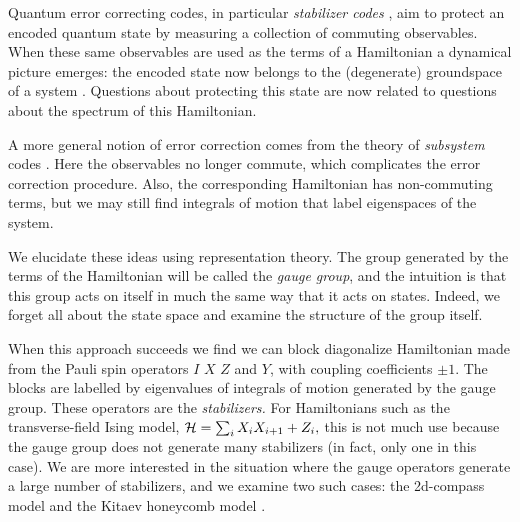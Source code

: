 \documentclass[12pt,notitlepage,longbibliography,nofootinbib,tightenlines]{revtex4}
\begin{document}
Quantum error correcting codes,
in particular {\it stabilizer codes} \cite{Gottesman1997},
aim to protect an encoded quantum state
by measuring a collection of commuting
observables.
When these same observables are used as
the terms of a Hamiltonian 
a dynamical picture emerges: the
encoded state now belongs to the
(degenerate) groundspace of a
system \cite{Dennis2001}. 
Questions about protecting
this state are now related to questions about
the spectrum of this Hamiltonian.

A more general notion of error correction
comes from the theory of 
{\it subsystem} codes \cite{Poulin2005}. 
Here the observables
no longer commute, which complicates
the error correction procedure.
Also, the corresponding Hamiltonian
has non-commuting terms, but
we may still find integrals of
motion that label eigenspaces
of the system.

We elucidate these ideas using representation theory. 
The group generated by the terms of the Hamiltonian
will be called the {\it gauge group},
and the intuition is that this
group acts on itself in much the same way
that it acts on states. 
Indeed, we forget all about the state space and
examine the structure of the group itself.

When this approach succeeds we find we can
block diagonalize Hamiltonian made from 
the Pauli spin operators
$I$ $X$ $Z$ and $Y$, with coupling coefficients
$\pm 1.$
The blocks are labelled by eigenvalues of
integrals of motion generated by the gauge
group. These operators are the {\it stabilizers.}
For Hamiltonians such as
the transverse-field Ising model,
$\mathcal{H} = \sum_i X_i X_{i+1} + Z_i,$
this is not much use because the 
gauge group does not generate many
stabilizers (in fact, only one in this case).
We are more interested in the situation
where the gauge operators generate a large 
number of stabilizers, and we examine two
such cases: the 2d-compass model \cite{Bacon2006} and
the Kitaev honeycomb model \cite{Kitaev2006}.

\end{document}
